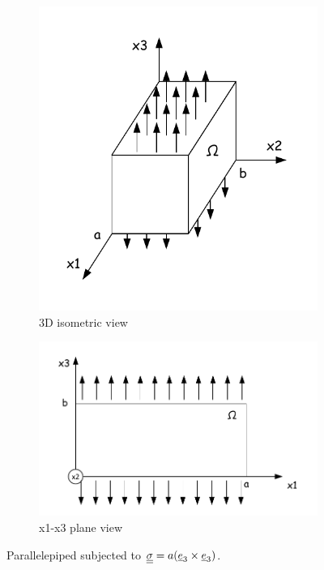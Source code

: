 \documentclass[letter,12pt]{article}
\begin{document}
\begin{figure}[ht]
	\centering
	\begin{subfigure}{.4\textwidth}
		\centering
		\includegraphics[width=1\linewidth]{figures/normal333d}
		\caption{3D isometric view}
	\end{subfigure}
	\hspace{10mm}
	\begin{subfigure}{.45\textwidth}
		\centering
		\includegraphics[width=1\linewidth]{figures/normal33}
		\caption{x1-x3 plane view}
	\end{subfigure}	
	\caption{Parallelepiped subjected to $\underline{\underline{\sigma}} = a (\underline{e}_3 \times \underline{e}_3)$.}
	\label{fig:replacewithrealfigure}
\end{figure}
\end{document}
